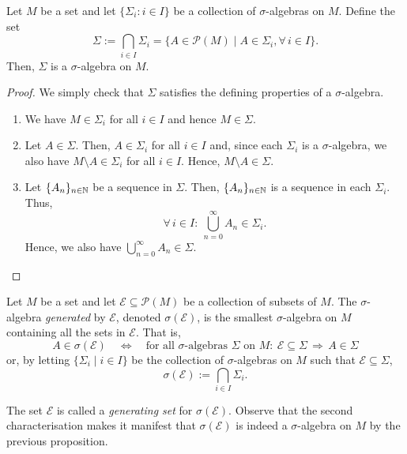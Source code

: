 \begin{proposition}
Let $M$ be a set and let $\{ \Sigma_i : i \in I\}$ be a collection of
$\sigma$-algebras on $M$. Define the set
\begin{equation*}
\Sigma :=\bigcap_{i\in I}\Sigma_i = \{ A \in \mathscr{P}(M) \mid A \in \Sigma_i, \forall \, i \in I \}.
\end{equation*}
Then, $\Sigma$ is a $\sigma$-algebra on $M$.
\end{proposition}
\begin{proof}
We simply check that $\Sigma$ satisfies the defining properties of a $\sigma$-algebra.
\begin{enumerate}[label=(\roman*)]
\item We have $M \in \Sigma_i$ for all $i \in I$ and hence $ M \in \Sigma$.  
\item Let $A \in \Sigma$. Then, $A \in \Sigma_i$ for all $i \in I$
and, since each $\Sigma_i$ is a $\sigma$-algebra, we also have
$M\setminus A \in \Sigma_i$ for all $i\in I$. Hence, $M\setminus A \in
\Sigma$.
\item Let $\{A_n\}_{n\in\mathbb{N}}$ be a sequence in $\Sigma$. Then, $\{A_n\}_{n\in\mathbb{N}}$ is a sequence in each $\Sigma_i$. Thus,
\begin{equation*}
\forall \, i\in I : \ \bigcup_{n=0}^{\infty}{A_n} \in \Sigma_i.
\end{equation*}
Hence, we also have $\bigcup_{n=0}^{\infty}{A_n} \in \Sigma$. \qedhere
\end{enumerate}
\end{proof}

\begin{definition}
Let $M$ be a set and let $\mathcal{E}\subseteq\mathscr{P}(M)$ be a collection of subsets of $M$. The $\sigma$-algebra \emph{generated} by $\mathcal{E}$, denoted $\sigma(\mathcal{E})$, is the smallest $\sigma$-algebra on $M$ containing all the sets in $\mathcal{E}$. That is,
\begin{equation*}
A\in\sigma(\mathcal{E}) \quad \Leftrightarrow \quad  \text{for all $\sigma$-algebras }\Sigma \text{ on } M :\ \mathcal{E}\subseteq \Sigma \, \Rightarrow\, A\in \Sigma
\end{equation*}
or, by letting $\{\Sigma_i\mid i\in I\}$ be the collection of $\sigma$-algebras on $M$ such that $\mathcal{E}\subseteq \Sigma$,
\begin{equation*}
\sigma(\mathcal{E}):=\bigcap_{i\in I}\Sigma_i.
\end{equation*}
\end{definition}
The set $\mathcal{E}$ is called a \emph{generating set} for $\sigma(\mathcal{E})$. Observe that the second characterisation makes it manifest that $\sigma(\mathcal{E})$ is indeed a $\sigma$-algebra on $M$ by the previous proposition.

